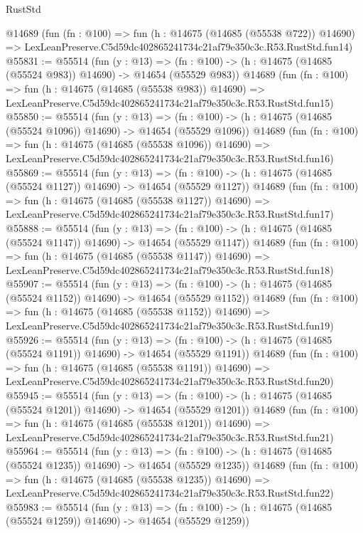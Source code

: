 \begin{lexlean}{RustStd}
\begin{coremodule}
    @14689
    (fun (fn : @100) =>
    fun (h : @14675 (@14685 (@55538 @722)) @14690) =>
    LexLeanPreserve.C5d59dc402865241734c21af79e350c3c.R53.RustStd.fun14)
@55831 := @55514
    (fun (y : @13) =>
    (fn : @100) -> (h : @14675 (@14685 (@55524 @983)) @14690) -> @14654 (@55529 @983))
    @14689
    (fun (fn : @100) =>
    fun (h : @14675 (@14685 (@55538 @983)) @14690) =>
    LexLeanPreserve.C5d59dc402865241734c21af79e350c3c.R53.RustStd.fun15)
@55850 := @55514
    (fun (y : @13) =>
    (fn : @100) -> (h : @14675 (@14685 (@55524 @1096)) @14690) -> @14654 (@55529 @1096))
    @14689
    (fun (fn : @100) =>
    fun (h : @14675 (@14685 (@55538 @1096)) @14690) =>
    LexLeanPreserve.C5d59dc402865241734c21af79e350c3c.R53.RustStd.fun16)
@55869 := @55514
    (fun (y : @13) =>
    (fn : @100) -> (h : @14675 (@14685 (@55524 @1127)) @14690) -> @14654 (@55529 @1127))
    @14689
    (fun (fn : @100) =>
    fun (h : @14675 (@14685 (@55538 @1127)) @14690) =>
    LexLeanPreserve.C5d59dc402865241734c21af79e350c3c.R53.RustStd.fun17)
@55888 := @55514
    (fun (y : @13) =>
    (fn : @100) -> (h : @14675 (@14685 (@55524 @1147)) @14690) -> @14654 (@55529 @1147))
    @14689
    (fun (fn : @100) =>
    fun (h : @14675 (@14685 (@55538 @1147)) @14690) =>
    LexLeanPreserve.C5d59dc402865241734c21af79e350c3c.R53.RustStd.fun18)
@55907 := @55514
    (fun (y : @13) =>
    (fn : @100) -> (h : @14675 (@14685 (@55524 @1152)) @14690) -> @14654 (@55529 @1152))
    @14689
    (fun (fn : @100) =>
    fun (h : @14675 (@14685 (@55538 @1152)) @14690) =>
    LexLeanPreserve.C5d59dc402865241734c21af79e350c3c.R53.RustStd.fun19)
@55926 := @55514
    (fun (y : @13) =>
    (fn : @100) -> (h : @14675 (@14685 (@55524 @1191)) @14690) -> @14654 (@55529 @1191))
    @14689
    (fun (fn : @100) =>
    fun (h : @14675 (@14685 (@55538 @1191)) @14690) =>
    LexLeanPreserve.C5d59dc402865241734c21af79e350c3c.R53.RustStd.fun20)
@55945 := @55514
    (fun (y : @13) =>
    (fn : @100) -> (h : @14675 (@14685 (@55524 @1201)) @14690) -> @14654 (@55529 @1201))
    @14689
    (fun (fn : @100) =>
    fun (h : @14675 (@14685 (@55538 @1201)) @14690) =>
    LexLeanPreserve.C5d59dc402865241734c21af79e350c3c.R53.RustStd.fun21)
@55964 := @55514
    (fun (y : @13) =>
    (fn : @100) -> (h : @14675 (@14685 (@55524 @1235)) @14690) -> @14654 (@55529 @1235))
    @14689
    (fun (fn : @100) =>
    fun (h : @14675 (@14685 (@55538 @1235)) @14690) =>
    LexLeanPreserve.C5d59dc402865241734c21af79e350c3c.R53.RustStd.fun22)
@55983 := @55514
    (fun (y : @13) =>
    (fn : @100) -> (h : @14675 (@14685 (@55524 @1259)) @14690) -> @14654 (@55529 @1259))

\end{coremodule}
\end{lexlean}
